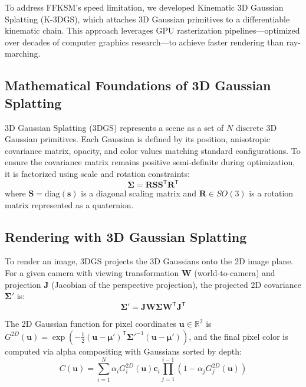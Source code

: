 \documentclass[12pt,a4paper,oneside]{report}
\begin{document}
To address FFKSM's speed limitation, we developed Kinematic 3D Gaussian Splatting (K-3DGS), which attaches 3D Gaussian primitives to a differentiable kinematic chain. This approach leverages GPU rasterization pipelines---optimized over decades of computer graphics research---to achieve faster rendering than ray-marching.

\subsection{Mathematical Foundations of 3D Gaussian Splatting}

3D Gaussian Splatting (3DGS) represents a scene as a set of $N$ discrete 3D Gaussian primitives. Each Gaussian is defined by its position, anisotropic covariance matrix, opacity, and color values matching standard configurations. To ensure the covariance matrix remains positive semi-definite during optimization, it is factorized using scale and rotation constraints:
\begin{equation}
\boldsymbol{\Sigma} = \mathbf{R} \mathbf{S} \mathbf{S}^\mathsf{T} \mathbf{R}^\mathsf{T}
\end{equation}
where $\mathbf{S} = \text{diag}(\mathbf{s})$ is a diagonal scaling matrix and $\mathbf{R} \in SO(3)$ is a rotation matrix represented as a quaternion.

\subsection{Rendering with 3D Gaussian Splatting}

To render an image, 3DGS projects the 3D Gaussians onto the 2D image plane. For a given camera with viewing transformation $\mathbf{W}$ (world-to-camera) and projection $\mathbf{J}$ (Jacobian of the perspective projection), the projected 2D covariance $\boldsymbol{\Sigma}'$ is:
\begin{equation}
\boldsymbol{\Sigma}' = \mathbf{J} \mathbf{W} \boldsymbol{\Sigma} \mathbf{W}^\mathsf{T} \mathbf{J}^\mathsf{T}
\end{equation}

The 2D Gaussian function for pixel coordinates $\mathbf{u} \in \mathbb{R}^2$ is $G^{2D}(\mathbf{u}) = \exp\left(-\frac{1}{2} (\mathbf{u} - \boldsymbol{\mu}')^\mathsf{T} \boldsymbol{\Sigma}'^{-1} (\mathbf{u} - \boldsymbol{\mu}')\right)$, and the final pixel color is computed via alpha compositing with Gaussians sorted by depth:
\begin{equation}
C(\mathbf{u}) = \sum_{i=1}^{N} \alpha_i G_i^{2D}(\mathbf{u}) \mathbf{c}_i \prod_{j=1}^{i-1} (1 - \alpha_j G_j^{2D}(\mathbf{u}))
\end{equation}
\end{document}
